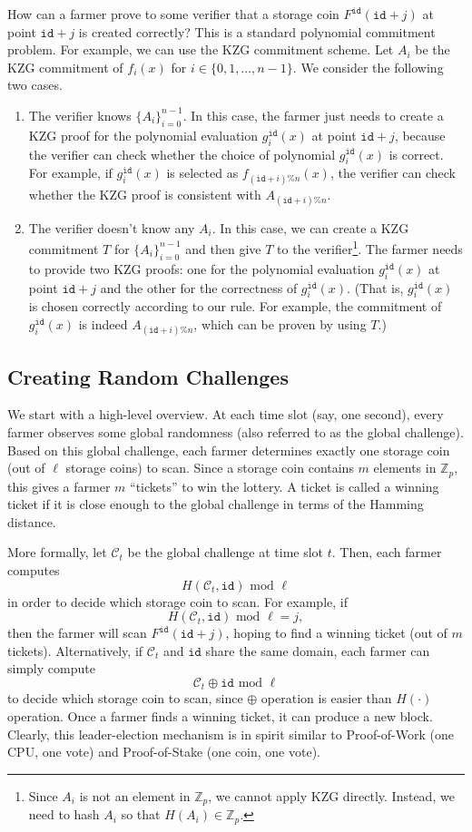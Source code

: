\documentclass[12pt, onecolumn]{IEEEtran}
\newcommand{\Fp}{\mathbb{Z}_p}
\newcommand{\id}{\texttt{id}}
\begin{document}
How can a farmer prove to some verifier that a storage coin $F^{\id}(\id + j)$ at point $\id + j$ is created correctly? This is a standard polynomial commitment problem. For example, we can use the
KZG commitment scheme. Let $A_i$ be the KZG commitment of $f_i(x)$ for $i \in \{0, 1, \ldots, n-1\}$. 
We consider the following two cases.
\begin{enumerate}
    \item The verifier knows $\{ A_i \}_{i = 0}^{n - 1}$. In this case, the farmer just needs to create a KZG proof for the polynomial evaluation $g_i^{\id}(x)$ at point $\id + j$, because the verifier can check whether the choice of polynomial $g_i^{\id}(x)$ is correct. For example, if $g_i^{\id}(x)$ is selected as $f_{(\id + i)\% n}(x)$, the verifier can check whether the KZG proof is consistent with $A_{(\id + i)\% n}$. 
    \item The verifier doesn't know any $A_i$. In this case, we can create a KZG commitment $T$ for $\{ A_i \}_{i = 0}^{n - 1}$ and then give $T$ to the verifier\footnote{Since $A_i$ is not an element in $\Fp$, we cannot apply KZG directly. Instead, we need to hash $A_i$ so that $H(A_i) \in \Fp$.}.  The farmer needs to provide two KZG proofs: one for the polynomial evaluation $g_i^{\id}(x)$ at point $\id + j$ and the other for the correctness of $g_i^{\id}(x)$. (That is, $g_i^{\id}(x)$ is chosen correctly according to our rule. For example, the commitment of $g_i^{\id}(x)$ is indeed $A_{(\id + i)\% n}$, which can be proven by using $T$.)
\end{enumerate}

\subsection{Creating Random Challenges}

We start with a high-level overview. At each time slot (say, one second), every farmer observes some global randomness (also referred to as the global challenge). 
Based on this global challenge, each farmer determines exactly one storage coin (out of $\ell$ storage coins) to scan. Since a storage coin contains $m$ elements in $\Fp$, this gives a farmer $m$ ``tickets'' to win the lottery. A ticket is called a winning ticket if it is close enough to the global challenge in terms of the Hamming distance.

More formally, let $\mathcal{C}_t$ be the global challenge at time slot $t$. Then, each farmer computes
\[
H(\mathcal{C}_t, \id) \mbox{ mod } \ell
\]
in order to decide which storage coin to scan.
For example, if 
\[
H(\mathcal{C}_t, \id) \mbox{ mod } \ell = j,
\]
then the farmer will scan $F^{\id}(\id + j)$, hoping to find a winning ticket (out of $m$ tickets). 
Alternatively, if $\mathcal{C}_t$ and $\id$ share the same domain, each farmer can simply compute
\[
\mathcal{C}_t \oplus \id \mbox{ mod } \ell
\]
to decide which storage coin to scan, since $\oplus$ operation is easier than $H(\cdot)$ operation. 
Once a farmer finds a winning ticket, it can produce a new block.
Clearly, this leader-election mechanism is in spirit similar to Proof-of-Work (one CPU, one vote) and Proof-of-Stake (one coin, one vote).
\end{document}
